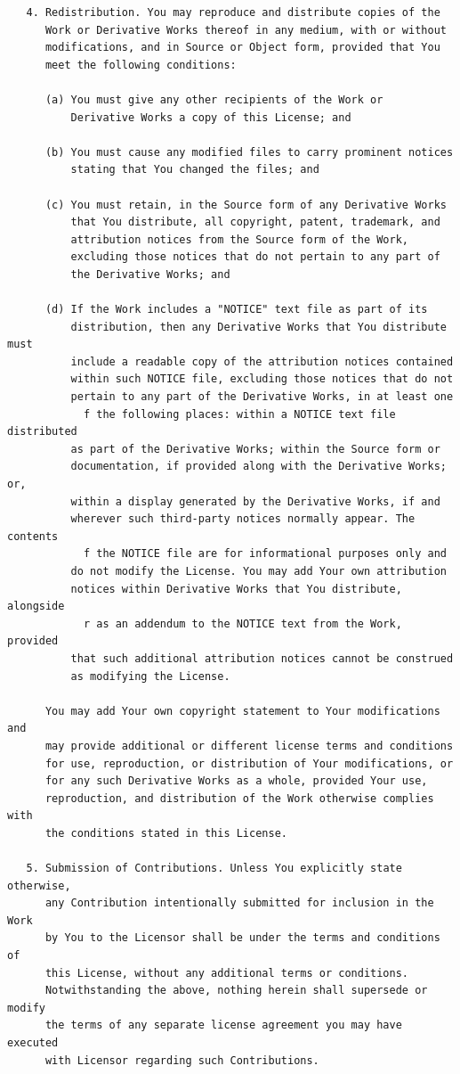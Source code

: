 \documentclass[10pt, headsepline,DIV14,BCOR0.5cm]{scrreprt}
\begin{document}
\begin{lstlisting}
   4. Redistribution. You may reproduce and distribute copies of the
      Work or Derivative Works thereof in any medium, with or without
      modifications, and in Source or Object form, provided that You
      meet the following conditions:

      (a) You must give any other recipients of the Work or
          Derivative Works a copy of this License; and

      (b) You must cause any modified files to carry prominent notices
          stating that You changed the files; and

      (c) You must retain, in the Source form of any Derivative Works
          that You distribute, all copyright, patent, trademark, and
          attribution notices from the Source form of the Work,
          excluding those notices that do not pertain to any part of
          the Derivative Works; and

      (d) If the Work includes a "NOTICE" text file as part of its
          distribution, then any Derivative Works that You distribute must
          include a readable copy of the attribution notices contained
          within such NOTICE file, excluding those notices that do not
          pertain to any part of the Derivative Works, in at least one
            f the following places: within a NOTICE text file distributed
          as part of the Derivative Works; within the Source form or
          documentation, if provided along with the Derivative Works; or,
          within a display generated by the Derivative Works, if and
          wherever such third-party notices normally appear. The contents
            f the NOTICE file are for informational purposes only and
          do not modify the License. You may add Your own attribution
          notices within Derivative Works that You distribute, alongside
            r as an addendum to the NOTICE text from the Work, provided
          that such additional attribution notices cannot be construed
          as modifying the License.

      You may add Your own copyright statement to Your modifications and
      may provide additional or different license terms and conditions
      for use, reproduction, or distribution of Your modifications, or
      for any such Derivative Works as a whole, provided Your use,
      reproduction, and distribution of the Work otherwise complies with
      the conditions stated in this License.

   5. Submission of Contributions. Unless You explicitly state otherwise,
      any Contribution intentionally submitted for inclusion in the Work
      by You to the Licensor shall be under the terms and conditions of
      this License, without any additional terms or conditions.
      Notwithstanding the above, nothing herein shall supersede or modify
      the terms of any separate license agreement you may have executed
      with Licensor regarding such Contributions.


\end{lstlisting}
\end{document}
